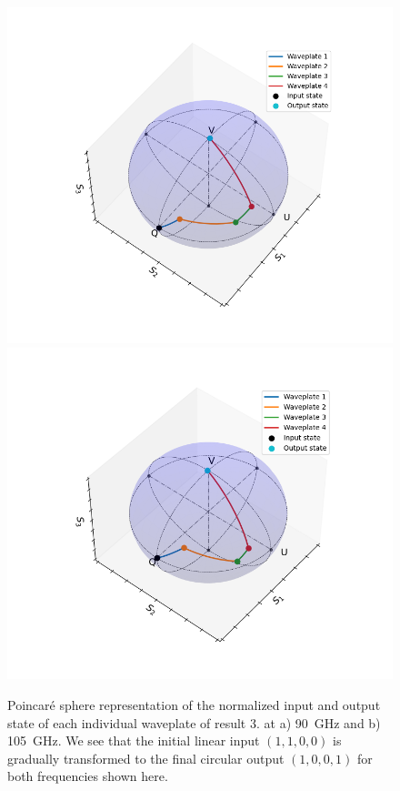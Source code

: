 \begin{figure}[H]
    \centering
    \subcaptionbox{\label{fig:res3_poincare_90ghz}}
        {\includegraphics[width=0.47\linewidth]{images/results/plots/polymer/poincare/Poincare_Res3_90GHz.png}}
    \subcaptionbox{\label{fig:res3_poincare_105ghz}}
        {\includegraphics[width=0.47\linewidth]{images/results/plots/polymer/poincare/Poincare_Res3_105GHz.png}}
    \caption{Poincaré sphere representation of the normalized input and output state of each individual waveplate of result 3. at a) \SI{90}{\giga \hertz} and b) \SI{105}{\giga \hertz}. We see that the initial linear input $(1,1,0,0)$ is gradually transformed to the final circular output $(1,0,0,1)$ for both frequencies shown here.}
    \label{fig:res3_poincare}
\end{figure}


